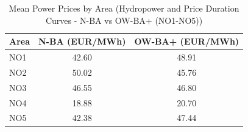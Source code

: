 \begin{table}[htbp]
\centering
\caption{Mean Power Prices by Area (Hydropower and Price Duration Curves - N-BA vs OW-BA+ (NO1-NO5))}
\label{tab:mean_prices_NO_areas_N_BA_OW_BA_plus}
\begin{tabular}{lcc}
\hline
Area & N-BA (EUR/MWh) & OW-BA+ (EUR/MWh) \\
\hline
NO1 & 42.60 & 48.91 \\
NO2 & 50.02 & 45.76 \\
NO3 & 46.55 & 46.80 \\
NO4 & 18.88 & 20.70 \\
NO5 & 42.38 & 47.44 \\
\hline
\end{tabular}
\end{table}